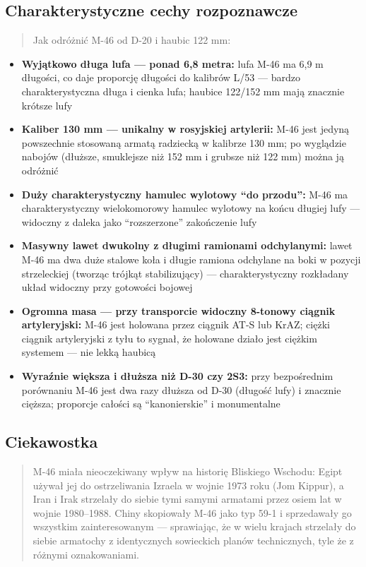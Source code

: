 \documentclass[12pt,oneside]{book}
\providecommand{\tightlist}{%
  \setlength{\itemsep}{0pt}\setlength{\parskip}{0pt}}
\begin{document}
\subsection{Charakterystyczne cechy
rozpoznawcze}\label{charakterystyczne-cechy-rozpoznawcze-28}

\begin{quote}
Jak odróżnić M-46 od D-20 i haubic 122 mm:
\end{quote}

\begin{itemize}
\tightlist
\item
  \textbf{Wyjątkowo długa lufa --- ponad 6,8 metra:} lufa M-46 ma 6,9 m
  długości, co daje proporcję długości do kalibrów L/53 --- bardzo
  charakterystyczna długa i cienka lufa; haubice 122/152 mm mają
  znacznie krótsze lufy
\item
  \textbf{Kaliber 130 mm --- unikalny w rosyjskiej artylerii:} M-46 jest
  jedyną powszechnie stosowaną armatą radziecką w kalibrze 130 mm; po
  wyglądzie nabojów (dłuższe, smuklejsze niż 152 mm i grubsze niż 122
  mm) można ją odróżnić
\item
  \textbf{Duży charakterystyczny hamulec wylotowy ``do przodu'':} M-46
  ma charakterystyczny wielokomorowy hamulec wylotowy na końcu długiej
  lufy --- widoczny z daleka jako ``rozszerzone'' zakończenie lufy
\item
  \textbf{Masywny lawet dwukolny z długimi ramionami odchylanymi:} lawet
  M-46 ma dwa duże stalowe koła i długie ramiona odchylane na boki w
  pozycji strzeleckiej (tworząc trójkąt stabilizujący) ---
  charakterystyczny rozkładany układ widoczny przy gotowości bojowej
\item
  \textbf{Ogromna masa --- przy transporcie widoczny 8-tonowy ciągnik
  artyleryjski:} M-46 jest holowana przez ciągnik AT-S lub KrAZ; ciężki
  ciągnik artyleryjski z tyłu to sygnał, że holowane działo jest ciężkim
  systemem --- nie lekką haubicą
\item
  \textbf{Wyraźnie większa i dłuższa niż D-30 czy 2S3:} przy
  bezpośrednim porównaniu M-46 jest dwa razy dłuższa od D-30 (długość
  lufy) i znacznie cięższa; proporcje całości są ``kanonierskie'' i
  monumentalne
\end{itemize}

\subsection{Ciekawostka}\label{ciekawostka-28}

\begin{quote}
M-46 miała nieoczekiwany wpływ na historię Bliskiego Wschodu: Egipt
używał jej do ostrzeliwania Izraela w wojnie 1973 roku (Jom Kippur), a
Iran i Irak strzelały do siebie tymi samymi armatami przez osiem lat w
wojnie 1980--1988. Chiny skopiowały M-46 jako typ 59-1 i sprzedawały go
wszystkim zainteresowanym --- sprawiając, że w wielu krajach strzelały
do siebie armatochy z identycznych sowieckich planów technicznych, tyle
że z różnymi oznakowaniami.
\end{quote}
\end{document}
